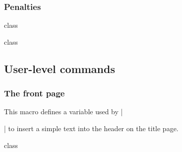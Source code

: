 \documentclass{skdoc}
\begin{document}
	\subsubsection{Penalties}
\begin{MacroCode}{class}
\setcounter{topnumber}{2}
\setcounter{bottomnumber}{1}
\setcounter{totalnumber}{4}
\setcounter{dbltopnumber}{2}
\end{MacroCode}
	\begin{macro*}{\topfraction}
	\begin{macro*}{\bottomfraction}
	\begin{macro*}{\textfraction}
	\begin{macro*}{\floatpagefraction}
	\begin{macro*}{\dbltopfraction}
	\begin{macro*}{\dblfloatpagefraction}
\begin{MacroCode}{class}
\renewcommand\topfraction{.75}
\renewcommand\bottomfraction{.5}
\renewcommand\textfraction{.25}
\renewcommand\floatpagefraction{.625}
\renewcommand\dbltopfraction{.75}
\renewcommand\dblfloatpagefraction{.625}
\end{MacroCode}
	\end{macro*}
	\end{macro*}
	\end{macro*}
	\end{macro*}
	\end{macro*}
	\end{macro*}

	\subsection{User-level commands}
	\subsubsection{The front page}
	\begin{macro}{\regarding}
	This macro defines a variable used by |\maketitle| to insert a 
	simple text into the header on the title page.
	\begin{macro*}{\@regarding}
\begin{MacroCode}{class}
\def\@regarding{\relax}
\newcommand{\regarding}[1]{\gdef\@regarding{#1}}
\end{MacroCode}
	\end{macro*}
	\end{macro}
\end{document}
